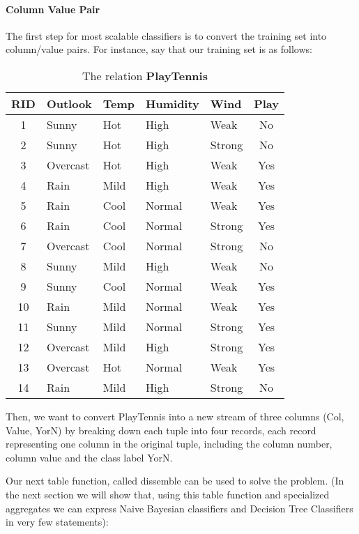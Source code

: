 \paragraph{Column Value Pair}The first step for most scalable classifiers
is to convert the training set into column/value pairs. For instance,
say that our training set is as follows:

\begin{table}[htb]
\begin{center}
{\footnotesize
\begin{tabular}{|c|l|l|l|l|c|} \hline
{\bf RID}&{\bf Outlook}&{\bf Temp}&{\bf Humidity}&{\bf Wind}&{\bf Play}\\
\hline
1&Sunny&Hot&High&Weak&No\\
2&Sunny&Hot&High&Strong&No\\
3&Overcast&Hot&High&Weak&Yes\\
4&Rain&Mild&High&Weak&Yes\\
5&Rain&Cool&Normal&Weak&Yes\\
6&Rain&Cool&Normal&Strong&Yes\\
7&Overcast&Cool&Normal&Strong&No\\
8&Sunny&Mild&High&Weak&No\\
9&Sunny&Cool&Normal&Weak&Yes\\
10&Rain&Mild&Normal&Weak&Yes\\
11&Sunny&Mild&Normal&Strong&Yes\\
12&Overcast&Mild&High&Strong&Yes\\
13&Overcast&Hot&Normal&Weak&Yes\\
14&Rain&Mild&High&Strong&No\\ \hline
\end{tabular}
}
\caption{The relation \bf PlayTennis\inv \inv} \label{tab:tennis}
\end{center}
\end{table}

Then, we want to convert {\bw PlayTennis} into a new
stream of three columns {\bw (Col, Value, YorN)} by breaking down each
tuple into four records, each record representing one column in the
original tuple, including the column number, column value and the
class label {\bw YorN}.

Our next table function, called
{\bw dissemble}  can be used to solve the problem.
(In the next section we will show that,
using this table function and specialized aggregates we can
express Naive Bayesian classifiers and Decision Tree Classifiers in
very few statements):


